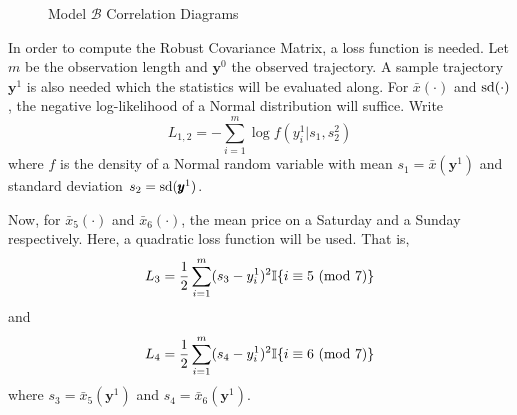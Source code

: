 \begin{figure}[H]
        \centering
        \qquad
        \caption{Model $\mathcal{B}$ Correlation Diagrams}
        \label{fig:smcd}
\end{figure}

In order to compute the Robust Covariance Matrix, a loss function is needed. Let $m$ be the observation length and $\pmb{y}^0$ the observed trajectory. A sample trajectory $\pmb{y}^1$ is also needed which the statistics will be evaluated along. For $\bar{x}(\cdot)$ and $\mathop{}\!\text{sd}{(\cdot)}$, the negative log-likelihood of a Normal distribution will suffice. Write
\begin{equation}
    L_{1,2} = -\sum_{i=1}^m \log{f(y^1_i | s_1, s_2^2)}
\end{equation}
where $f$ is the density of a Normal random variable with mean $s_1 = \bar{x}(\pmb{y}^1)$ and standard deviation $s_2 = \mathop{}\!\text{sd}{(\pmb{y}^1})$.

Now, for $\bar{x}_5(\cdot)$ and $\bar{x}_6(\cdot)$, the mean price on a Saturday and a Sunday respectively. Here, a quadratic loss function will be used. That is,
\begin{equation}
    L_3 = \frac{1}{2}\sum_{i=1}^m (s_3 - y^1_i)^2 \mathbb{I}\{i \equiv 5 \ (\mathrm{mod}\ 7)\}
\end{equation}
and
\begin{equation}
    L_4 = \frac{1}{2}\sum_{i=1}^m (s_4 - y^1_i)^2 \mathbb{I}\{i \equiv 6 \ (\mathrm{mod}\ 7)\}
\end{equation}
where $s_3 = \bar{x}_5(\pmb{y}^1)$ and $s_4 = \bar{x}_6(\pmb{y}^1)$.

